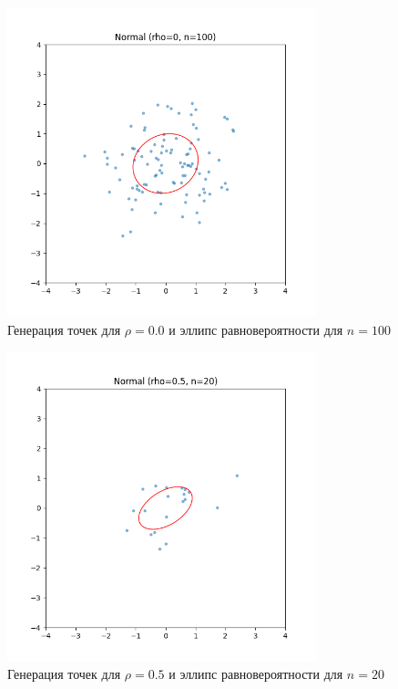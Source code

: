 \documentclass[a4paper]{article}
\begin{document}
    \begin{figure}[H]
        \centering
        \includegraphics[width=0.8\textwidth]{./plots/normal_rho0_n100}
        \caption{Генерация точек для $\rho = 0.0$ и эллипс равновероятности для $n=100$}
        \label{fig:normal_rho0_n100}
    \end{figure}

    \begin{figure}[H]
        \centering
        \includegraphics[width=0.8\textwidth]{./plots/normal_rho0.5_n20}
        \caption{Генерация точек для $\rho = 0.5$ и эллипс равновероятности для $n=20$}
        \label{fig:normal_rho0.5_n20}
    \end{figure}
\end{document}
